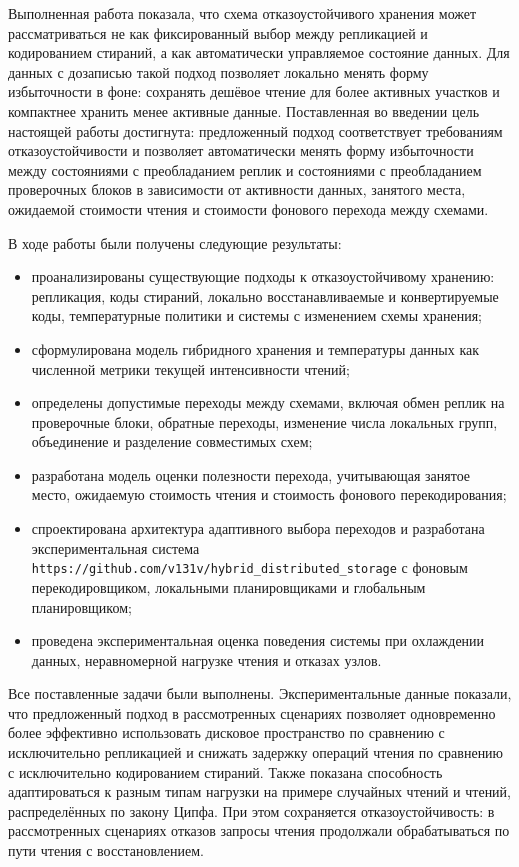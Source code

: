 
Выполненная работа показала, что схема отказоустойчивого хранения может
рассматриваться не как фиксированный выбор между репликацией и кодированием
стираний, а как автоматически управляемое состояние данных. Для данных с
дозаписью такой подход позволяет локально менять форму избыточности в фоне:
сохранять дешёвое чтение для более активных участков и компактнее хранить
менее активные данные. Поставленная во введении цель настоящей работы
достигнута: предложенный подход соответствует требованиям отказоустойчивости и
позволяет автоматически менять форму избыточности между состояниями с
преобладанием реплик и состояниями с преобладанием проверочных блоков в
зависимости от активности данных, занятого места, ожидаемой стоимости чтения и
стоимости фонового перехода между схемами.

В ходе работы были получены следующие результаты:
\begin{itemize}
    \item проанализированы существующие подходы к отказоустойчивому хранению:
    репликация, коды стираний, локально восстанавливаемые и конвертируемые
    коды, температурные политики и системы с изменением схемы хранения;
    \item сформулирована модель гибридного хранения и температуры данных как
    численной метрики текущей интенсивности чтений;
    \item определены допустимые переходы между схемами, включая обмен
    реплик на проверочные блоки, обратные переходы, изменение числа
    локальных групп, объединение и разделение совместимых схем;
    \item разработана модель оценки полезности перехода, учитывающая занятое
    место, ожидаемую стоимость чтения и стоимость фонового перекодирования;
    \item спроектирована архитектура адаптивного выбора переходов и разработана
    экспериментальная система \nolinkurl{https://github.com/v131v/hybrid_distributed_storage} с фоновым перекодировщиком, локальными
    планировщиками и глобальным планировщиком;
    \item проведена экспериментальная оценка поведения системы при охлаждении
    данных, неравномерной нагрузке чтения и отказах узлов.
\end{itemize}

Все поставленные задачи были выполнены. Экспериментальные данные показали, что
предложенный подход в рассмотренных сценариях позволяет одновременно более эффективно
использовать дисковое пространство по сравнению с исключительно репликацией и снижать
задержку операций чтения по сравнению с исключительно кодированием стираний.
Также показана способность адаптироваться к разным типам нагрузки на примере
случайных чтений и чтений, распределённых по закону Ципфа. При этом сохраняется
отказоустойчивость: в рассмотренных сценариях отказов запросы чтения
продолжали обрабатываться по пути чтения с восстановлением.

